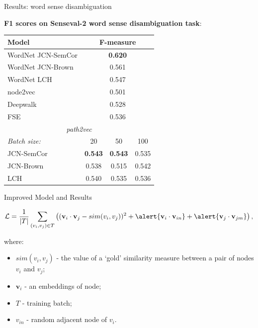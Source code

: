 \begin{frame}{Results: word sense disambiguation}

\textbf{F1 scores on Senseval-2 word sense disambiguation task}:

\begin{table}
\footnotesize
\begin{tabular}{lccc}
\toprule
Model & \multicolumn{3}{c}{F-measure} \\
\midrule
WordNet JCN-SemCor & \multicolumn{3}{c}{\textbf{0.620}} \\
WordNet JCN-Brown &   \multicolumn{3}{c}{0.561} \\
WordNet LCH & \multicolumn{3}{c}{0.547} \\
node2vec~\cite{grover2016node2vec} & \multicolumn{3}{c}{0.501} \\
Deepwalk~\cite{perozzi2014deepwalk} & \multicolumn{3}{c}{0.528} \\
FSE~\cite{subercaze:2015}  & \multicolumn{3}{c}{0.536} \\
\midrule
\multicolumn{4}{c}{ \textit{path2vec}} \\
\midrule
\textit{Batch size:} & 20 & 50 & 100 \\
\midrule
JCN-SemCor & \textbf{0.543} & \textbf{0.543} & 0.535 \\
JCN-Brown & 0.538 & 0.515 & 0.542 \\
LCH & 0.540 & 0.535 & 0.536 \\
\bottomrule
\end{tabular}
\end{table}
	
\end{frame}




\begin{frame}{Improved Model and Results}

%
%
%
$$
\mathcal{L} = \frac{1}{|T|}  \sum_{ (v_i, v_j) \in T } \left( (\mathbf{v}_i \cdot \mathbf{v}_j - sim(v_i, v_j) )^2  + \alert{\mathbf{v}_i \cdot \mathbf{v}_{in}} + \alert{\mathbf{v}_j \cdot \mathbf{v}_{jm}} \right) ,
$$


where:

\begin{itemize}
	\item $sim(v_i, v_j)$ - the value of a `gold' similarity measure between a pair of nodes $v_i$ and $v_j$;
	\item $\mathbf{v}_i$ - an embeddings of node;
	\item $T$ - training batch; 
	\item \alert{$v_{in}$ - random adjacent node of $v_i$}.
\end{itemize}

\end{frame}


